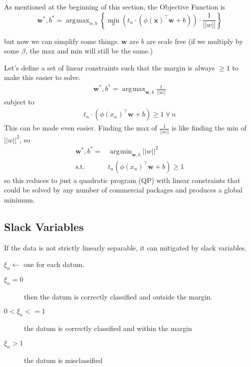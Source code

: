 \documentclass[11pt, oneside]{article}   	%
\DeclareMathOperator*{\argmin}{\arg\!\min}
\DeclareMathOperator*{\argmax}{\arg\!\max}
\begin{document}
As mentioned at the beginning of this section, the Objective Function is 
\begin{equation}
\mathbf{w}^*,b^*=
\argmax_{w,b} \left\{\min_n(t_n\cdot(\phi(\mathbf{x})^\intercal\mathbf{w}+b))\cdot\frac{1}{||w||} \right\}
\end{equation}

but now we can simplify some things. $\mathbf{w}$ are $b$ are scale free (if we multiply by some $\beta$, the max and min will still be the same.)

Let's define a set of linear constraints such that the margin is always $\ge 1$ to make this easier to solve.
\begin{align}
\mathbf{w}^*,b^*= \argmax_{\mathbf{w},b}\frac{1}{||w||}
\end{align}
subject to 
\begin{align}
t_n\cdot(\phi(x_n)^\intercal\mathbf{w}+b) \ge 1 \:\forall\: n
\end{align}
This can be made even easier. Finding the max of $\frac{1}{||w||}$ is like finding the min of $||w||^2$, so
\begin{align}
\mathbf{w}^*,b^*=& \argmin_{\mathbf{w},b}||w||^2 \\
\text{s.t.} \:& t_n(\phi(x_n)^\intercal\mathbf{w} + b) \ge 1
\end{align}
so this reduces to just a quadratic program (QP) with linear constraints that could be solved by any number of commercial packages and produces a global minimum.

\subsection{Slack Variables}
If the data is not strictly linearly separable, it can mitigated by slack variables.

$\xi_n \leftarrow$ one for each datum. 
\begin{description}
 \item[$\xi_n = 0$] then the datum is correctly classified and outside the margin.
 \item[$0 < \xi_n <= 1$] the datum is correctly classified and within the margin
 \item[$\xi_n > 1$] the datum is misclassified
\end{description}
\end{document}
